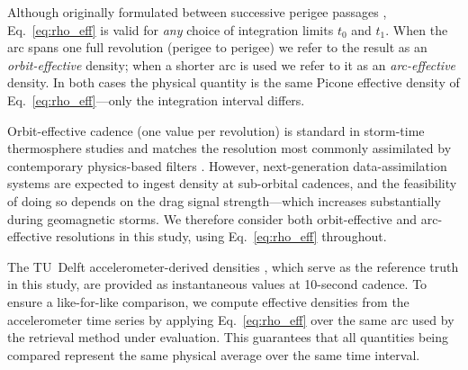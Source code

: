\documentclass[draft]{agujournal2019}
\begin{document}
Although originally formulated between successive perigee passages
\cite{Picone2005ThermosphericSets}, Eq.~\eqref{eq:rho_eff} is valid for
\emph{any} choice of integration limits $t_{0}$ and $t_{1}$. When the arc
spans one full revolution (perigee to perigee) we refer to the result as
an \emph{orbit-effective} density; when a shorter arc is used we refer to it
as an \emph{arc-effective} density. In both cases the physical quantity is the
same Picone effective density of Eq.~\eqref{eq:rho_eff}—only the integration
interval differs.

Orbit-effective cadence (one value per revolution) is standard in storm-time
thermosphere studies \cite{Fitzpatrick2024ApplyingSatellite,
Chen2014Storm-timePropagation, Bruinsma2018SpaceOrbit,
Li2017ThermosphericMethod} and matches the resolution most commonly
assimilated by contemporary physics-based filters \cite{Matsuo2012DataDensity,
Sutton2018AThermosphere, Sutton2021TowardSatellites}. However, next-generation
data-assimilation systems are expected to ingest density at sub-orbital
cadences, and the feasibility of doing so depends on the drag signal
strength—which increases substantially during geomagnetic storms. We therefore
consider both orbit-effective and arc-effective resolutions in this study,
using Eq.~\eqref{eq:rho_eff} throughout.

The TU~Delft accelerometer-derived densities
\cite{Siemes2023NewGRACE-FO}, which serve as the reference truth in this
study, are provided as instantaneous values at 10-second cadence. To ensure
a like-for-like comparison, we compute effective densities from the
accelerometer time series by applying Eq.~\eqref{eq:rho_eff} over the same
arc used by the retrieval method under evaluation. This guarantees that all
quantities being compared represent the same physical average over the same
time interval.
\end{document}
